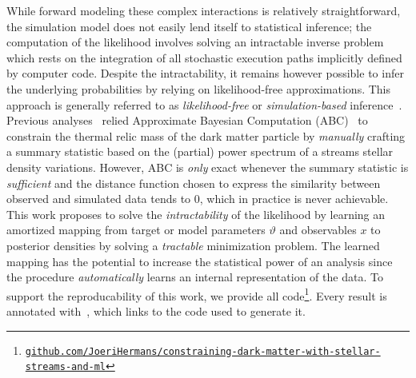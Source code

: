 \documentclass{article}
\begin{document}
While forward modeling these complex interactions is relatively straightforward,
the simulation model does not easily lend itself to statistical inference;
the computation of the likelihood involves solving an
intractable inverse problem which rests on the integration of all stochastic execution paths implicitly defined by computer code.
Despite the intractability,
it remains however possible to infer the underlying probabilities by relying on
likelihood-free approximations. This approach is generally referred
to as \emph{likelihood-free}
or \emph{simulation-based} inference~\citep{cranmer2020frontier}.
Previous analyses~\cite{banik2018probing,banik2019novel} relied Approximate Bayesian Computation (ABC)~\citep{rubin1984bayesianly}
to constrain the thermal relic mass of the dark matter particle by \emph{manually} crafting
a summary statistic based on the (partial) power spectrum of a streams stellar density variations.
However, ABC is \emph{only} exact whenever the summary statistic
is \emph{sufficient} and the distance
function chosen to express the similarity between
observed and simulated data tends to 0, which in practice is never achievable.
This work proposes to solve the \emph{intractability} of the likelihood by
learning an amortized mapping
from target or model parameters $\vartheta$ and observables $x$ to posterior densities by solving a
\emph{tractable} minimization problem. The learned mapping has the potential
to increase the statistical power of an analysis since the procedure
\emph{automatically} learns an internal representation of the data.
To support the reproducability of this work,
we provide all code\footnote{\href{https://github.com/JoeriHermans/constraining-dark-matter-with-stellar-streams-and-ml}{\texttt{github.com/JoeriHermans/constraining-dark-matter-with-stellar-streams-and-ml}}}.
Every result is annotated with~, which links to the code used to generate it.
\end{document}
